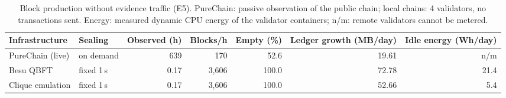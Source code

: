 \begin{table}[t]
\centering
\scriptsize
\caption{Block production without evidence traffic (E5). PureChain: passive observation of the public chain; local chains: 4 validators, no transactions sent. Energy: measured dynamic CPU energy of the validator containers; n/m: remote validators cannot be metered.}
\label{tab:idle}
\begin{adjustbox}{max width=\textwidth}
\begin{tabular}{llrrrrr}
\toprule
Infrastructure & Sealing & Observed (h) & Blocks/h & Empty (\%) & Ledger growth (MB/day) & Idle energy (Wh/day) \\
\midrule
PureChain (live) & on demand & 639 & 170 & 52.6 & 19.61 & n/m \\
Besu QBFT & fixed 1\,s & 0.17 & 3,606 & 100.0 & 72.78 & 21.4 \\
Clique emulation & fixed 1\,s & 0.17 & 3,606 & 100.0 & 52.66 & 5.4 \\
\bottomrule
\end{tabular}\end{adjustbox}
\end{table}
